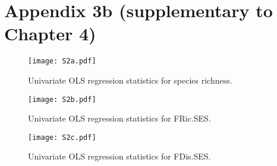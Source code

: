 \chapter[Appendix 3b]{Appendix 3b (supplementary to Chapter 4)}

\begin{landscape}
\begin{figure}[h!]
\begin{center}
\texttt{[image: S2a.pdf]} %
\caption[Univariate OLS regression statistics for species richness.]{\small{Univariate OLS regression statistics for species richness.}} %
\label{fig:Ch4sup2_F1} %
\end{center}
\end{figure}   
\end{landscape}
\clearpage

\begin{landscape}
\begin{figure}[h!]
\begin{center}
\texttt{[image: S2b.pdf]} %
\caption[Univariate OLS regression statistics for FRic.SES.]{\small{Univariate OLS regression statistics for FRic.SES.}} %
\label{fig:Ch4sup2_F1} %
\end{center}
\end{figure}   
\end{landscape}
\clearpage

\begin{landscape}
\begin{figure}[h!]
\begin{center}
\texttt{[image: S2c.pdf]} %
\caption[Univariate OLS regression statistics for FDis.SES.]{\small{Univariate OLS regression statistics for FDis.SES.}} %
\label{fig:Ch4sup2_F1} %
\end{center}
\end{figure}   
\end{landscape}
\clearpage

